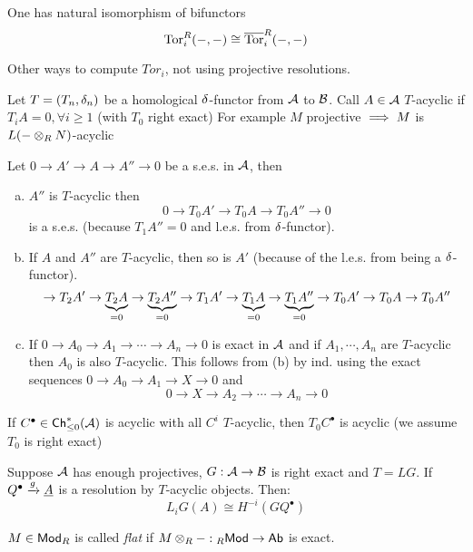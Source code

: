\documentclass[a4paper]{report}
\begin{document}
\begin{thm}
  One has natural isomorphism of bifunctors \[\operatorname{Tor}_{i}^{R}(-,-) \cong \overline{\operatorname{Tor}}_{i}^{R}(-,-)\]
\end{thm}
Other ways to compute $Tor_{i}$, not using projective resolutions.

\begin{defi}
  Let $T = (T_{n},\delta_{n})$ be a homological $\delta$-functor from $\mathcal{A}$ to $\mathcal{B}$. Call $A \in \mathcal{A}$ $T$-acyclic if $T_{i} A = 0, \forall i \ge 1$ (with $T_{0}$ right exact)
  For example $M$ projective $\implies M$ is $L(-\otimes_{R}N)$-acyclic
\end{defi}

\begin{facts}
  Let $0 \to A' \to A \to A'' \to 0$ be a s.e.s. in $\mathcal{A}$, then
  \begin{enumerate}[(a)]
    \item $A''$ is $T$-acyclic then
          \[0 \to T_{0}A' \to T_{0}A \to T_{0}A'' \to 0\]
          is a s.e.s. (because $T_{1}A'' = 0$ and l.e.s. from $\delta$-functor).
    \item If $A$ and $A''$ are $T$-acyclic, then so is $A'$ (because of the l.e.s. from being a $\delta$-functor).
          \[\to T_{2}A' \to \underbrace{T_{2}A}_{=0} \to \underbrace{T_{2}A''}_{=0} \to T_{1} A' \to \underbrace{T_{1}A}_{=0} \to \underbrace{T_{1}A''}_{=0} \to T_{0}A' \to T_{0} A \to T_{0}A''\]
    \item If $0 \to A_{0} \to A_{1} \to \cdots \to A_{n} \to 0$ is exact in $\mathcal{A}$ and if $A_{1}, \cdots, A_{n}$ are $T$-acyclic then $A_{0}$ is also $T$-acyclic. This follows from (b) by ind. using the exact sequences $0 \to A_{0} \to A_{1} \to X \to 0$ and \[0 \to X \to A_{2} \to \cdots \to A_{n} \to 0\]
  \end{enumerate}
\end{facts}

\begin{lemm}
If $C^{\bullet} \in \mathsf{Ch}^*_{\le 0}(\mathcal{A})$ is acyclic with all $C^{i}$ $T$-acyclic, then $T_{0}C^{\bullet}$ is acyclic (we assume $T_{0}$ is right exact)
\end{lemm}
\begin{cor}
  Suppose $\mathcal{A}$ has enough projectives, $G : \mathcal{A} \to \mathcal{B}$ is right exact and $T = LG$. If $Q^{\bullet} \xrightarrow g \underline A$ is a resolution by $T$-acyclic objects. Then:
  \[L_{i}G(A) \cong H^{-i}(GQ^{\bullet})\]
\end{cor}

\begin{defi}
$M \in \mathsf{Mod}_R$ is called \emph{flat} if $M \otimes_{R} -: {}_R\mathsf{Mod} \to \mathsf{Ab}$ is exact.
\end{defi}
\end{document}
